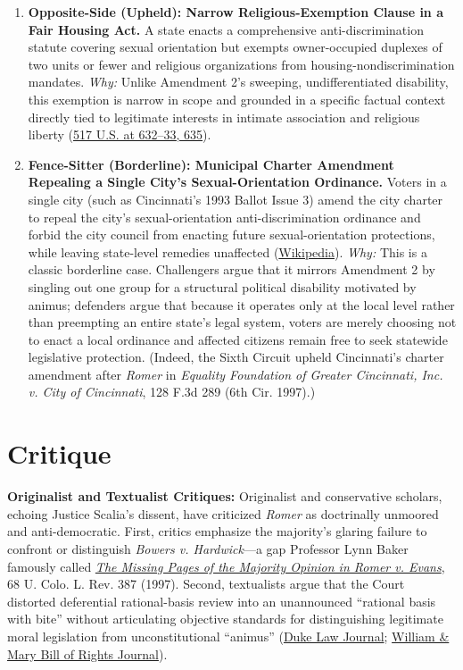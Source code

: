 \documentclass[12pt]{article}
\begin{document}
\begin{enumerate}
\item \textbf{Opposite-Side (Upheld): Narrow Religious-Exemption Clause in a Fair Housing Act.} A state enacts a comprehensive anti-discrimination statute covering sexual orientation but exempts owner-occupied duplexes of two units or fewer and religious organizations from housing-nondiscrimination mandates. \textit{Why:} Unlike Amendment 2's sweeping, undifferentiated disability, this exemption is narrow in scope and grounded in a specific factual context directly tied to legitimate interests in intimate association and religious liberty (\href{https://supreme.justia.com/cases/federal/us/517/620/}{517 U.S. at 632--33, 635}).
\item \textbf{Fence-Sitter (Borderline): Municipal Charter Amendment Repealing a Single City's Sexual-Orientation Ordinance.} Voters in a single city (such as Cincinnati's 1993 Ballot Issue 3) amend the city charter to repeal the city's sexual-orientation anti-discrimination ordinance and forbid the city council from enacting future sexual-orientation protections, while leaving state-level remedies unaffected (\href{https://en.wikipedia.org/wiki/Romer_v._Evans}{Wikipedia}). \textit{Why:} This is a classic borderline case. Challengers argue that it mirrors Amendment 2 by singling out one group for a structural political disability motivated by animus; defenders argue that because it operates only at the local level rather than preempting an entire state's legal system, voters are merely choosing not to enact a local ordinance and affected citizens remain free to seek statewide legislative protection. (Indeed, the Sixth Circuit upheld Cincinnati's charter amendment after \textit{Romer} in \textit{Equality Foundation of Greater Cincinnati, Inc. v. City of Cincinnati}, 128 F.3d 289 (6th Cir. 1997).)
\end{enumerate}

\section{Critique}

\textbf{Originalist and Textualist Critiques:} Originalist and conservative scholars, echoing Justice Scalia's dissent, have criticized \textit{Romer} as doctrinally unmoored and anti-democratic. First, critics emphasize the majority's glaring failure to confront or distinguish \textit{Bowers v. Hardwick}---a gap Professor Lynn Baker famously called \href{https://scholar.law.colorado.edu/cgi/viewcontent.cgi?article=1890&context=lawreview}{\textit{The Missing Pages of the Majority Opinion in Romer v. Evans}}, 68 U. Colo. L. Rev. 387 (1997). Second, textualists argue that the Court distorted deferential rational-basis review into an unannounced ``rational basis with bite'' without articulating objective standards for distinguishing legitimate moral legislation from unconstitutional ``animus'' (\href{https://scholarship.law.duke.edu/cgi/viewcontent.cgi?article=1081&context=dlj}{Duke Law Journal}; \href{https://scholarship.law.wm.edu/cgi/viewcontent.cgi?article=1450&context=wmborj}{William \& Mary Bill of Rights Journal}).
\end{document}
